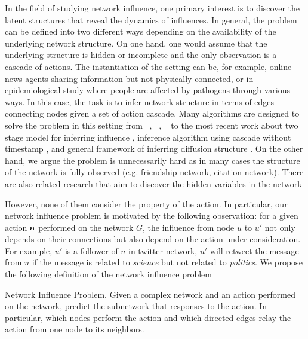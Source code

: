 {In the field of studying network influence, one primary interest is to discover the latent structures that reveal the dynamics of influences.
In general, the problem can be defined into two different ways depending on the availability of the underlying network structure.
On one hand, one would assume that the underlying structure is hidden or incomplete and the only observation is a cascade of actions.
The instantiation of the setting can be, for example, online news agents sharing information but not physically connected, or in epidemiological study where people are affected by pathogens through various ways.
In this case, the task is to infer network structure in terms of edges connecting nodes given a set of action cascade.
Many algorithms are designed to solve the problem in this setting from \netinf\ \citep{GomezRodriguez10inferring}, \netrate\ \citep{Rodrigues11unconvering}, \ \citep{Du12learning} to the most recent work about two stage model for inferring influence \citep{Du14influence}, inference algorithm using cascade without timestamp \citep{Amin14learning}, and general framework of inferring diffusion structure \citep{Daneshmand14estimating}.
On the other hand, we argue the problem is unnecessarily hard as in many cases the structure of the network is fully observed (e.g. friendship network, citation network).
There are also related research that aim to discover the hidden variables in the network \citep{Lovrek08prediction,Goyal10learning}

However, none of them consider the property of the action.
In particular, our network influence problem is motivated by the following observation: for a given action $\mathbf {a}$ performed on the network $G$, the influence from node $u$ to $u'$ not only depends on their connections but also depend on the action under consideration.
For example, $u'$ is a follower of $u$ in twitter network, $u'$ will retweet the message from $u$ if the message is related to \textit{science} but not related to \textit{politics}.
We propose the following definition of the network influence problem
\begin{definition}{Network Influence Problem.}
	Given a complex network and an action performed on the network, predict the subnetwork that responses to the action. In particular, which nodes perform the action and which directed edges relay the action from one node to its neighbors.
\end{definition}

}
